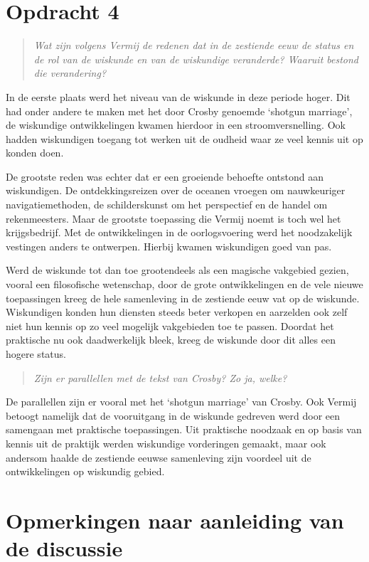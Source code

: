 \documentclass[a4paper,11pt]{article}
\begin{document}
\section*{Opdracht 4}


\begin{quote}
\emph{Wat zijn volgens Vermij de redenen dat in de zestiende eeuw de status en
  de rol van de wiskunde en van de wiskundige veranderde? Waaruit bestond die
  verandering?}
\end{quote}


In de eerste plaats werd het niveau van de wiskunde in deze periode hoger. Dit
had onder andere te maken met het door Crosby genoemde `shotgun marriage', de
wiskundige ontwikkelingen kwamen hierdoor in een stroomversnelling. Ook hadden
wiskundigen toegang tot werken uit de oudheid waar ze veel kennis uit op
konden doen.

De grootste reden was echter dat er een groeiende behoefte ontstond aan
wiskundigen. De ontdekkingsreizen over de oceanen vroegen om nauwkeuriger
navigatiemethoden, de schilderskunst om het perspectief en de handel om
rekenmeesters. Maar de grootste toepassing die Vermij noemt is toch wel het
krijgsbedrijf. Met de ontwikkelingen in de oorlogsvoering werd het
noodzakelijk vestingen anders te ontwerpen. Hierbij kwamen wiskundigen goed
van pas.

Werd de wiskunde tot dan toe grootendeels als een magische vakgebied gezien,
vooral een filosofische wetenschap, door de grote ontwikkelingen en de vele
nieuwe toepassingen kreeg de hele samenleving in de zestiende eeuw vat op de
wiskunde. Wiskundigen konden hun diensten steeds beter verkopen en aarzelden
ook zelf niet hun kennis op zo veel mogelijk vakgebieden toe te
passen. Doordat het praktische nu ook daadwerkelijk bleek, kreeg de wiskunde
door dit alles een hogere status.


\begin{quote}
\emph{Zijn er parallellen met de tekst van Crosby? Zo ja, welke?}
\end{quote}


De parallellen zijn er vooral met het `shotgun marriage' van Crosby. Ook
Vermij betoogt namelijk dat de vooruitgang in de wiskunde gedreven werd door
een samengaan met praktische toepassingen. Uit praktische noodzaak en op basis
van kennis uit de praktijk werden wiskundige vorderingen gemaakt, maar ook
andersom haalde de zestiende eeuwse samenleving zijn voordeel uit de
ontwikkelingen op wiskundig gebied.


\section*{Opmerkingen naar aanleiding van de discussie}
\end{document}
